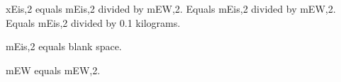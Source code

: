 xEis,2 equals mEis,2 divided by mEW,2.  
Equals mEis,2 divided by mEW,2.  
Equals mEis,2 divided by 0.1 kilograms.  

mEis,2 equals blank space.  

mEW equals mEW,2.